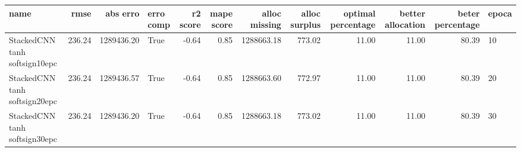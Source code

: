 \begin{tabular}{lrrlrrrrrrrl}
\toprule
name & rmse & abs erro & erro comp & r2 score & mape score & alloc missing & alloc surplus & optimal percentage & better allocation & beter percentage & epoca \\
\midrule
StackedCNN tanh softsign10epc & 236.24 & 1289436.20 & True & -0.64 & 0.85 & 1288663.18 & 773.02 & 11.00 & 11.00 & 80.39 & 10 \\
StackedCNN tanh softsign20epc & 236.24 & 1289436.57 & True & -0.64 & 0.85 & 1288663.60 & 772.97 & 11.00 & 11.00 & 80.39 & 20 \\
StackedCNN tanh softsign30epc & 236.24 & 1289436.20 & True & -0.64 & 0.85 & 1288663.18 & 773.02 & 11.00 & 11.00 & 80.39 & 30 \\
\bottomrule
\end{tabular}
